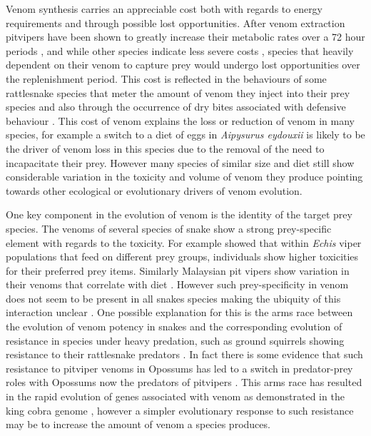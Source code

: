 Venom synthesis carries an appreciable cost both with regards to energy requirements and through possible lost opportunities. After venom extraction pitvipers have been shown to greatly increase their metabolic rates over a 72 hour periods \cite{mccue2006cost}, and while other species indicate less severe costs \citep{pintor2010costs}, species that heavily dependent on their venom to capture prey would undergo lost opportunities over the replenishment period. This cost is reflected in the behaviours of some rattlesnake species that meter the amount of venom they inject into their prey species \citep{hayes1995venom} and also through the occurrence of dry bites associated with defensive behaviour \citep{morgenstern2013venom}. This cost of venom explains the loss or reduction of venom in many species, for example a switch to a diet of eggs in \textit{Aipysurus eydouxii} is likely to be the driver of venom loss in this species due to the removal of the need to incapacitate their prey. However many species of similar size and diet still show considerable variation in the toxicity and volume of venom they produce pointing towards other ecological or evolutionary drivers of venom evolution.



One key component in the evolution of venom is the identity of the target prey species. The venoms of several species of snake show a strong prey-specific element with regards to the toxicity. For example \cite{barlow2009coevolution} showed that within \textit{Echis} viper populations that feed on different prey groups, individuals show higher toxicities for their preferred prey items. Similarly Malaysian pit vipers show variation in their venoms that correlate with diet \citep{daltry1996diet}. However such prey-specificity in venom does not seem to be present in all snakes species making the ubiquity of this interaction unclear \citep{williams1988variation}. One possible explanation for this is the arms race between the evolution of venom potency in snakes and the corresponding evolution of resistance in species under heavy predation, such as ground squirrels showing resistance to their rattlesnake predators \citep{poran1987resistance}. In fact there is some evidence that such resistance to pitviper venoms in Opossums has led to a switch in predator-prey roles with Opossums now the predators of pitvipers \citep{voss2013opossums}. This arms race has resulted in the rapid evolution of genes associated with venom as demonstrated in the king cobra genome \citep{vonk2013king}, however a simpler evolutionary response to such resistance may be to increase the amount of venom a species produces.


